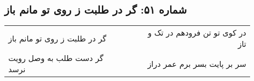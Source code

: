 \begin{center}
\section*{شماره ۵۱: گر در طلبت ز روی تو مانم باز}
\label{sec:051}
\begin{longtable}{l p{0.5cm} r}
گر در طلبت ز روی تو مانم باز
&&
در کوی تو تن فرودهم در تک و تاز
\\
گر دست طلب به وصل رویت نرسد
&&
سر بر پایت بسر برم عمر دراز
\\
\end{longtable}
\end{center}

